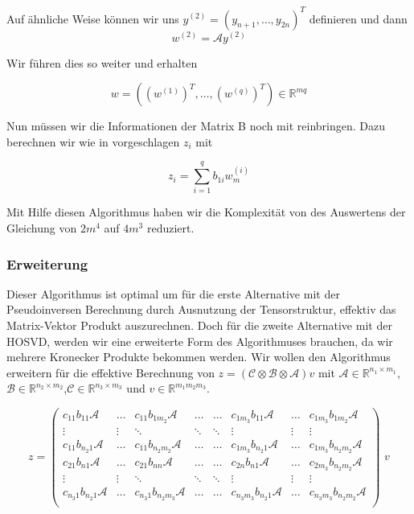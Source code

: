 Auf ähnliche Weise können wir uns $y^{(2)}=(y_{n+1},\dots,y_{2n})^{T}$ definieren und dann
\begin{equation*}
w^{(2)} = \mathcal{A}y^{(2)}
\end{equation*}

Wir führen dies so weiter und erhalten

\begin{equation*}
w=( (w^{(1)})^T , \dots, (w^{(q)})^T) \in \mathbb{R}^{mq}
\end{equation*}

Nun müssen wir die Informationen der Matrix B noch mit reinbringen. Dazu berechnen wir wie in \cite{Teachlet} vorgeschlagen $z_i$ mit

\begin{equation*}
z_i = \sum_{i=1}^{q} b_{1i} w_m^{(i)}
\end{equation*}

Mit Hilfe diesen Algorithmus haben wir die Komplexität von des Auswertens der Gleichung von $2m^4$ auf $4m^3$ reduziert.

\subsubsection{Erweiterung}
Dieser Algorithmus ist optimal um für die erste Alternative mit der Pseudoinversen Berechnung durch Ausnutzung der Tensorstruktur, effektiv das Matrix-Vektor Produkt auszurechnen. Doch für die zweite Alternative mit der HOSVD, werden wir eine erweiterte Form des Algorithmuses brauchen, da wir mehrere Kronecker Produkte bekommen werden. Wir wollen den Algorithmus erweitern für die effektive Berechnung von $z=(\mathcal{C} \otimes \mathcal{B} \otimes \mathcal{A})v$ mit $\mathcal{A} \in \mathbb{R}^{n_1 \times m_1}$, $\mathcal{B} \in \mathbb{R}^{n_2 \times m_2}$,$\mathcal{C} \in \mathbb{R}^{n_3 \times m_3}$ und $v \in \mathbb{R}^{m_1 m_2 m_3}$.


\begin{equation} z=
\begin{pmatrix}
c_{11} b_{11} \mathcal{A} & \dots  & c_{11} b_{1m_2} \mathcal{A} & \dots & \dots & c_{1m_3}b_{11}\mathcal{A} & \dots & c_{1m_3}b_{1m_2}\mathcal{A}  \\

\vdots & \vdots & \ddots & \ddots  & \ddots & \vdots & \vdots & \vdots \\
c_{11} b_{n_2 1} \mathcal{A} & \dots  & c_{11} b_{n_2 m_2} \mathcal{A} & \dots & \dots & c_{1 m_3}b_{n_2 1}\mathcal{A} & \dots & c_{1 m_3}b_{n_2 m_2}\mathcal{A}  \\
c_{21} b_{n1} \mathcal{A} & \dots  & c_{21} b_{nn} \mathcal{A} & \dots & \dots & c_{2n}b_{n1}\mathcal{A} & \dots & c_{2 m_3}b_{n_2 m_2}\mathcal{A}  \\
\vdots & \vdots & \ddots & \ddots  & \ddots & \vdots & \vdots & \vdots \\
c_{n_3 1} b_{n_2 1} \mathcal{A} & \dots  & c_{n_3 1} b_{n_2 m_3} \mathcal{A} & \dots & \dots & c_{n_3 m_3}b_{n_2 1}\mathcal{A} & \dots & c_{n_3 m_3}b_{n_2 m_2}\mathcal{A}  \\
\end{pmatrix} \, \, v
\end{equation}

